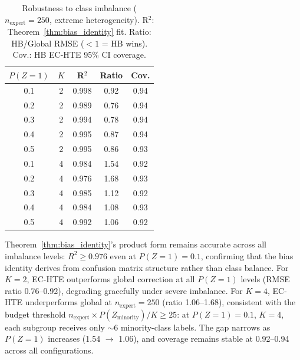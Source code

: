 \begin{table}[t]
\centering
\caption{Robustness to class imbalance ($n_{\text{expert}}{=}250$, extreme heterogeneity). R$^2$: Theorem~\ref{thm:bias_identity} fit. Ratio: HB/Global RMSE ($<1$ = HB wins). Cov.: HB EC-HTE 95\% CI coverage.}
\label{tab:pz1_sweep}
\small
\begin{tabular}{cc ccc}
\toprule
$P(Z{=}1)$ & $K$ & R$^2$ & Ratio & Cov. \\
\midrule
0.1 & 2 & 0.998 & 0.92 & 0.94 \\
0.2 & 2 & 0.989 & 0.76 & 0.94 \\
0.3 & 2 & 0.994 & 0.78 & 0.94 \\
0.4 & 2 & 0.995 & 0.87 & 0.94 \\
0.5 & 2 & 0.995 & 0.86 & 0.93 \\
\midrule
0.1 & 4 & 0.984 & 1.54 & 0.92 \\
0.2 & 4 & 0.976 & 1.68 & 0.93 \\
0.3 & 4 & 0.985 & 1.12 & 0.92 \\
0.4 & 4 & 0.984 & 1.08 & 0.93 \\
0.5 & 4 & 0.992 & 1.06 & 0.92 \\
\bottomrule
\end{tabular}
\end{table}

Theorem~\ref{thm:bias_identity}'s product form remains accurate across all imbalance levels: $R^2 \geq 0.976$ even at $P(Z{=}1) = 0.1$, confirming that the bias identity derives from confusion matrix structure rather than class balance.
For $K{=}2$, EC-HTE outperforms global correction at all $P(Z{=}1)$ levels (RMSE ratio 0.76--0.92), degrading gracefully under severe imbalance.
For $K{=}4$, EC-HTE underperforms global at $n_{\text{expert}}{=}250$ (ratio 1.06--1.68), consistent with the budget threshold $n_{\text{expert}} \times P(Z_{\text{minority}}) / K \geq 25$: at $P(Z{=}1){=}0.1$, $K{=}4$, each subgroup receives only ${\sim}6$ minority-class labels.
The gap narrows as $P(Z{=}1)$ increases (1.54 $\to$ 1.06), and coverage remains stable at 0.92--0.94 across all configurations.


